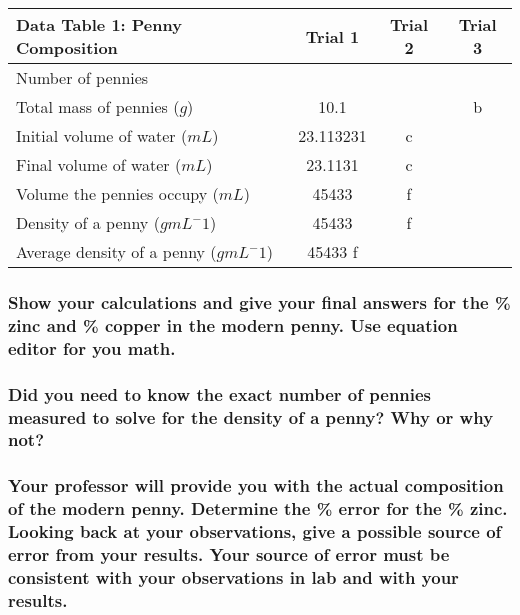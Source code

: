 \documentclass[a4paper,10pt]{article}
\begin{document}
        \begin{table}[h!]
            \label{tab:table1}
            \begin{tabular}{|l|c|c|c|}
                \hline
                \textbf{Data Table 1: Penny Composition} & \textbf{Trial 1} & \textbf{Trial 2} & \textbf{Trial 3}\\
                \hline
                Number of pennies & & & \\
                \hline
                Total mass of pennies ($g$) & 10.1 & & b \\
                \hline
                Initial volume of water ($mL$) & 23.113231 & c & \\
                \hline
                Final volume of water ($mL$) & 23.1131 & c & \\
                \hline
                Volume the pennies occupy ($mL$) & 45433 & f & \\
                \hline
                Density of a penny ($g mL^-1$) & 45433 & f & \\
                \hline
                Average density of a penny ($g mL^-1$) & 45433  f &&\\
                \hline
            \end{tabular}
        \end{table}

        \subsubsection{Show your calculations and give your final answers for the \% zinc and \% copper in the modern penny. Use equation editor for you math.}

        \subsubsection{Did you need to know the exact number of pennies measured to solve for the density of a penny? Why or why not?}

        \subsubsection{Your professor will provide you with the actual composition of the modern penny. Determine the \% error for the \% zinc. Looking back at your observations, give a possible source of error from your results. Your source of error must be consistent with your observations in lab and with your results.}
\end{document}
